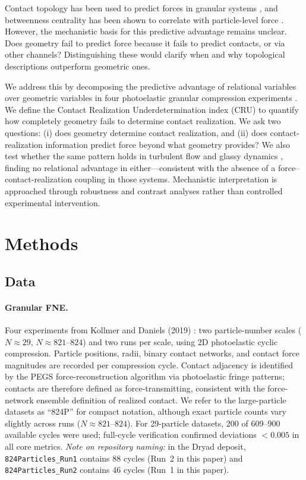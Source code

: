 \documentclass[11pt,a4paper]{article}
\begin{document}
Contact topology has been used to predict forces in granular systems \cite{walker2010,radjai1998}, and betweenness centrality has been shown to correlate with particle-level force \cite{kollmer2019}.
However, the mechanistic basis for this predictive advantage remains unclear.
Does geometry fail to predict force because it fails to predict contacts, or via other channels?
Distinguishing these would clarify when and why topological descriptions outperform geometric ones.

We address this by decomposing the predictive advantage of relational variables over geometric variables in four photoelastic granular compression experiments \cite{kollmer2019}.
We define the Contact Realization Underdetermination index (CRU) to quantify how completely geometry fails to determine contact realization.
We ask two questions: (i) does geometry determine contact realization, and (ii) does contact-realization information predict force beyond what geometry provides?
We also test whether the same pattern holds in turbulent flow \cite{li2008jhtdb} and glassy dynamics \cite{bapst2020}, finding no relational advantage in either---consistent with the absence of a force--contact-realization coupling in those systems.
Mechanistic interpretation is approached through robustness and contrast analyses rather than controlled experimental intervention.

\section{Methods}

\subsection{Data}\label{sec:data}

\paragraph{Granular FNE.}
Four experiments from Kollmer and Daniels (2019) \cite{kollmer2019}: two particle-number scales ($N \approx 29$, $N \approx 821$--$824$) and two runs per scale, using 2D photoelastic cyclic compression.
Particle positions, radii, binary contact networks, and contact force magnitudes are recorded per compression cycle. Contact adjacency is identified by the PEGS force-reconstruction algorithm \cite{kollmer2019} via photoelastic fringe patterns; contacts are therefore defined as force-transmitting, consistent with the force-network ensemble definition of realized contact.
We refer to the large-particle datasets as ``824P'' for compact notation, although exact particle counts vary slightly across runs ($N \approx 821$--$824$). For 29-particle datasets, 200 of 609--900 available cycles were used; full-cycle verification confirmed deviations $< 0.005$ in all core metrics.
\textit{Note on repository naming:} in the Dryad deposit, \texttt{824Particles\_Run1} contains 88 cycles (Run~2 in this paper) and \texttt{824Particles\_Run2} contains 46 cycles (Run~1 in this paper).
\end{document}
